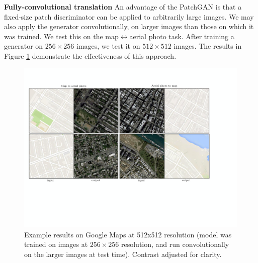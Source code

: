 \documentclass[10pt,twocolumn,letterpaper]{article}
\begin{document}
{\bf Fully-convolutional translation} An advantage of the PatchGAN is that a fixed-size patch discriminator can be applied to arbitrarily large images. We may also apply the generator convolutionally, on larger images than those on which it was trained. We test this on the map$\leftrightarrow$aerial photo task. After training a generator on $256\times256$ images, we test it on $512\times512$ images. The results in Figure \ref{sat2map_res} demonstrate the effectiveness of this approach.




\begin{figure}[t]
 \centering
 \includegraphics[width=1.0\hsize]{figs/sat2map_res_v6.pdf}
 \vspace{-0.2in}
  \caption{Example results on Google Maps at 512x512 resolution (model was trained on images at $256 \times 256$ resolution, and run convolutionally on the larger images at test time). Contrast adjusted for clarity.}
 \label{sat2map_res}
 \vspace{-0.2in}
\end{figure}


\end{document}
